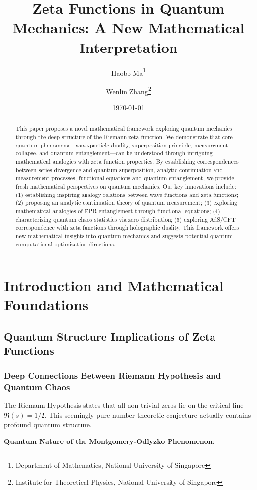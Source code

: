 \documentclass[11pt]{article}
\title{\textbf{Zeta Functions in Quantum Mechanics: A New Mathematical Interpretation}}
\author{
Haobo Ma\thanks{Department of Mathematics, National University of Singapore} \and
Wenlin Zhang\thanks{Institute for Theoretical Physics, National University of Singapore}
}
\date{\today}
\theoremstyle{plain}
\theoremstyle{definition}
\theoremstyle{remark}
\begin{document}
\maketitle

\begin{abstract}
This paper proposes a novel mathematical framework exploring quantum mechanics through the deep structure of the Riemann zeta function. We demonstrate that core quantum phenomena—wave-particle duality, superposition principle, measurement collapse, and quantum entanglement—can be understood through intriguing mathematical analogies with zeta function properties. By establishing correspondences between series divergence and quantum superposition, analytic continuation and measurement processes, functional equations and quantum entanglement, we provide fresh mathematical perspectives on quantum mechanics. Our key innovations include: (1) establishing inspiring analogy relations between wave functions and zeta functions; (2) proposing an analytic continuation theory of quantum measurement; (3) exploring mathematical analogies of EPR entanglement through functional equations; (4) characterizing quantum chaos statistics via zero distribution; (5) exploring AdS/CFT correspondence with zeta functions through holographic duality. This framework offers new mathematical insights into quantum mechanics and suggests potential quantum computational optimization directions.
\end{abstract}

\section{Introduction and Mathematical Foundations}

\subsection{Quantum Structure Implications of Zeta Functions}

\subsubsection{Deep Connections Between Riemann Hypothesis and Quantum Chaos}

The Riemann Hypothesis states that all non-trivial zeros lie on the critical line $\Re(s) = 1/2$. This seemingly pure number-theoretic conjecture actually contains profound quantum structure.

\textbf{Quantum Nature of the Montgomery-Odlyzko Phenomenon:}
\end{document}
